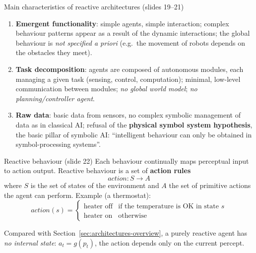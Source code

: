 \begin{nbfact}{Main characteristics of reactive architectures (slides 19--21)}
\begin{enumerate}
  \item \textbf{Emergent functionality}: simple agents, simple interaction; complex
        behaviour patterns appear as a result of the dynamic interactions; the global
        behaviour is \emph{not specified a priori} (e.g.\ the movement of robots depends on
        the obstacles they meet).
  \item \textbf{Task decomposition}: agents are composed of autonomous modules, each
        managing a given task (sensing, control, computation); minimal, low-level
        communication between modules; \emph{no global world model}; \emph{no
        planning/controller agent}.
  \item \textbf{Raw data}: basic data from sensors, no complex symbolic management of data
        as in classical AI; refusal of the \textbf{physical symbol system hypothesis}, the
        basic pillar of symbolic AI: ``intelligent behaviour can only be obtained in
        symbol-processing systems''.
\end{enumerate}
\end{nbfact}

\begin{nbdef}{Reactive behaviour (slide 22)}
Each behaviour continually maps perceptual input to action output. Reactive behaviour is a
set of \textbf{action rules}
\[ \mathit{action} : S \to A \]
where $S$ is the set of states of the environment and $A$ the set of primitive actions the
agent can perform. Example (a thermostat):
\[
\mathit{action}(s) =
\begin{cases}
\text{heater off} & \text{if the temperature is OK in state } s \\
\text{heater on} & \text{otherwise}
\end{cases}
\]
\end{nbdef}

Compared with Section~\ref{sec:architectures-overview}, a purely reactive agent has
\emph{no internal state}: $a_t = g(p_t)$, the action depends only on the current percept.

